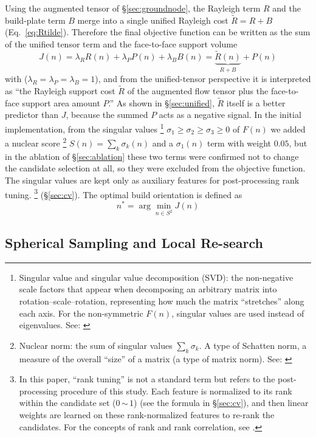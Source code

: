\documentclass[11pt,a4paper]{article}
\begin{document}
Using the augmented tensor of \S\ref{sec:groundnode}, the Rayleigh term $R$ and the build-plate term $B$
merge into a single unified Rayleigh cost $\tilde R=R+B$ (Eq.~\eqref{eq:Rtilde}).
Therefore the final objective function can be written as the sum of the unified tensor term and the face-to-face support volume
\begin{equation}
J(n)
=
\lambda_R R(n)
+
\lambda_P P(n)
+
\lambda_B B(n)
=
\underbrace{\tilde R(n)}_{R+B}
+
P(n)
\end{equation}
with ($\lambda_R=\lambda_P=\lambda_B=1$),
and from the unified-tensor perspective it is interpreted as ``the Rayleigh support cost $\tilde R$ of the augmented flow tensor
plus the face-to-face support area amount $P$.''
As shown in \S\ref{sec:unified}, $\tilde R$ itself is a better predictor than $J$,
because the summed $P$ acts as a negative signal.
In the initial implementation, from the singular values%
\footnote{Singular value and singular value decomposition (SVD): the non-negative scale factors that appear when decomposing an arbitrary matrix into rotation--scale--rotation,
representing how much the matrix ``stretches'' along each axis.
For the non-symmetric $F(n)$, singular values are used instead of eigenvalues. See: \cite{golubvanloan}}
$\sigma_1\ge\sigma_2\ge\sigma_3\ge0$ of $F(n)$
we added a nuclear score%
\footnote{Nuclear norm: the sum of singular values $\sum_k\sigma_k$. A type of Schatten norm,
a measure of the overall ``size'' of a matrix (a type of matrix norm). See: \cite{hornjohnson}}
$S(n)=\sum_k\sigma_k(n)$ and a $\sigma_1(n)$ term with weight $0.05$, but
in the ablation of \S\ref{sec:ablation} these two terms were confirmed not to change the candidate selection at all, so they were excluded from the objective function.
The singular values are kept only as auxiliary features for post-processing rank tuning.%
\footnote{In this paper, ``rank tuning'' is not a standard term but refers to the post-processing procedure of this study.
Each feature is normalized to its rank within the candidate set ($0$\,$\sim$\,$1$) (see the formula in \S\ref{sec:cv}),
and then linear weights are learned on these rank-normalized features to re-rank the candidates.
For the concepts of rank and rank correlation, see \cite{spearman1904}.}
(\S\ref{sec:cv}).
The optimal build orientation is defined as
\begin{equation}
n^* = \arg\min_{n\in S^2} J(n)
\end{equation}

\subsection{Spherical Sampling and Local Re-search}
\end{document}
